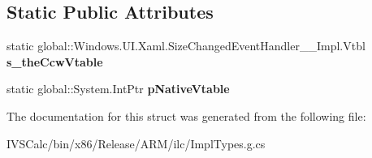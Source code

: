 \subsection*{Static Public Attributes}
\begin{DoxyCompactItemize}
\item 
\mbox{\label{struct_windows_1_1_u_i_1_1_xaml_1_1_size_changed_event_handler_____impl_1_1_vtbl_a86453437947ca5d52854839e2483e687}} 
static global\+::\+Windows.\+U\+I.\+Xaml.\+Size\+Changed\+Event\+Handler\+\_\+\+\_\+\+Impl.\+Vtbl {\bfseries s\+\_\+the\+Ccw\+Vtable}
\item 
\mbox{\label{struct_windows_1_1_u_i_1_1_xaml_1_1_size_changed_event_handler_____impl_1_1_vtbl_a55d733fc8957cdc08bf91097352a6903}} 
static global\+::\+System.\+Int\+Ptr {\bfseries p\+Native\+Vtable}
\end{DoxyCompactItemize}


The documentation for this struct was generated from the following file\+:\begin{DoxyCompactItemize}
\item 
I\+V\+S\+Calc/bin/x86/\+Release/\+A\+R\+M/ilc/Impl\+Types.\+g.\+cs\end{DoxyCompactItemize}
